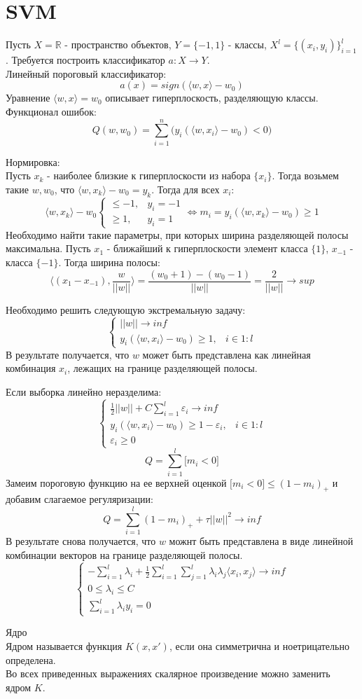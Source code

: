 \documentclass{article}
\begin{document}
\section*{SVM}
Пусть $X = \mathbb{R}$ - пространство объектов, $Y = \{-1, 1\}$ - классы, $X^l=\{(x_i, y_i)\}_{i=1}^l$. Требуется построить классификатор $a: X \rightarrow Y$.\\

Линейный пороговый классификатор:
$$a(x) = sign(\langle w, x\rangle - w_0)$$
Уравнение $\langle w, x\rangle = w_0$ описывает гиперплоскость, разделяющую классы.\\
Функционал ошибок:
$$Q(w, w_0) = \sum_{i=1}^n\Big( y_i(\langle w, x_i\rangle - w_0) < 0\Big)$$

Нормировка:\\
Пусть $x_k$ - наиболее близкие к гиперплоскости из набора $\{x_i\}$. Тогда возьмем такие $w, w_0$, что $\langle w, x_k\rangle - w_0 = y_k$. Тогда для всех $x_i$:
\[ \langle w, x_k\rangle - w_0 \left\{
\begin{array}{ll}
\leq -1, & y_i = -1\\
\geq 1, &  y_i = 1
\end{array} \right. \Leftrightarrow m_i = y_i(\langle w, x_k\rangle - w_0) \geq 1\]
Необходимо найти такие параметры, при которых ширина разделяющей полосы максимальна. Пусть $x_1$ - ближайший к гиперплоскости элемент класса $\{1\}$, $x_{-1}$ - класса $\{-1\}$. Тогда ширина полосы: 
$$\langle (x_1 - x_{-1}), \frac{w}{||w||}\rangle = \frac{(w_0 + 1) - (w_0 - 1)}{||w||} = \frac{2}{||w||} \rightarrow sup$$

Необходимо решить следующую экстремальную задачу:\\
\[\left\{
\begin{array}{ll}
||w|| \rightarrow inf\\
y_i(\langle w, x_i\rangle - w_0) \geq 1, & i\in 1:l
\end{array} \right.\]
В результате получается, что $w$ может быть представлена как линейная комбинация $x_i$, лежащих на границе разделяющей полосы. 

Если выборка линейно неразделима:\\
\[\left\{
\begin{array}{ll}
\frac{1}{2}||w|| + C \sum_{i=1}^l\varepsilon_i \rightarrow inf\\
y_i(\langle w, x_i\rangle - w_0) \geq 1 - \varepsilon_i, & i\in 1:l\\
\varepsilon_i \geq 0
\end{array} \right.\]
$$Q = \sum_{i=1}^l\Big[ m_i < 0\Big]$$
Замеим пороговую функцию на ее верхней оценкой $\Big[ m_i < 0\Big] \leq (1 - m_i)_+$ и добавим слагаемое регуляризации:
$$Q = \sum_{i=1}^l(1 - m_i)_+ + \tau ||w||^2 \rightarrow inf$$
В результате снова получается, что $w$ можнт быть представлена в виде линейной комбинации векторов на границе разделяющей полосы.
\[\left\{
\begin{array}{ll}
-\sum_{i=1}^l \lambda_i + \frac{1}{2}\sum_{i=1}^l\sum_{j=1}^l \lambda_i\lambda_j\langle x_i, x_j\rangle \rightarrow inf\\
0 \leq \lambda_i \leq C\\
\sum_{i=1}^l \lambda_iy_i = 0
\end{array} \right.\]
	
Ядро\\Ядром называется функция $K(x, x')$, если она симметрична и ноетрицательно определена.\\ 	
	
Во всех приведенных выражениях скалярное произведение можно заменить ядром $K$.
\end{document}
